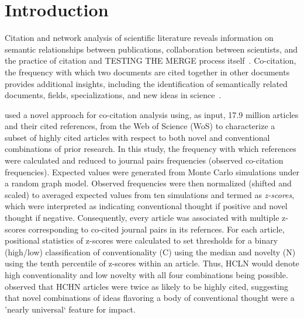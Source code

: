 \documentclass[NETN]{stjour}
\begin{document}
\section{Introduction}

Citation and network analysis of  scientific literature reveals information on semantic relationships between publications, collaboration between scientists, and the practice of citation  and TESTING THE MERGE process itself~\citep{garfield_citation_1955,de_solla_price_networks_1965,newman_structure_2001,Shi:2010:CHI:1816123.1816131,patience_pmid28560354}. Co-citation, the frequency with which two documents are cited together in other documents provides additional insights, including the identification of semantically related documents, fields, specializations, and new ideas in science~\citep{small_co-citation_1973, marshakova-shaikevich_co-citation_1973,boyack_co-citation_2010, 10.3389/frma.2018.00020}. 

\citep{uzzi_atypical_2013} used a novel approach for co-citation analysis using, as input, 17.9 million articles and their cited references, from the Web of Science (WoS)  to characterize a subset of highly cited articles with respect to both novel and conventional combinations of prior research. In this study, the frequency with which references were calculated and reduced to journal pairs frequencies (observed co-citation frequencies). Expected values were generated from Monte Carlo simulations under a random graph model. Observed frequencies were then normalized (shifted and scaled) to averaged expected values from ten simulations and termed as \emph{z-scores}, which were interpreted as indicating conventional thought if positive and novel thought if negative. Consequently, every article was associated with multiple z-scores corresponding to co-cited journal pairs in its refernces. For each article, positional statistics of z-scores were calculated to set thresholds for a binary (high/low) classification of conventionality (C) using the median and novelty (N) using the tenth percentile of z-scores within an article. Thus, HCLN would denote high conventionality and low novelty with all four combinations being possible. 
\cite{uzzi_atypical_2013} observed that HCHN articles were twice as likely to be highly cited, suggesting that novel combinations of ideas flavoring a body of conventional thought were a 'nearly universal` feature for impact. 
\end{document}
